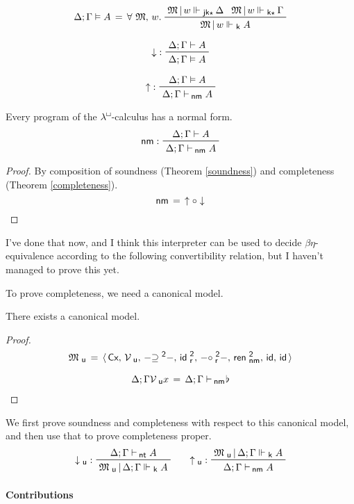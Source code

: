 \documentclass{entcs}
\numberwithin{equation}{thm}
\newcommand{\lambdabox}{\lambda^{\mkern-1mu\sq\mkern-2mu}}
\newcommand{\binop}[1]{-\mathord{#1}-}
\newcommand{\tsf}[1]{\textsf{\upshape{#1}}}
\newcommand{\stsf}[1]{\smash{\tsf{\small{#1}}}}
\renewcommand{\:}{\mathrel{:}}
\newcommand{\tyrule}[1]{\prftree[l]{${#1} \:\,$}}
\newcommand{\id}{\operatorname{\tsf{id}}}
\newcommand{\comp}{\mathrel{\circ}}
\let\oldforall\forall
\renewcommand{\forall}{\oldforall\,}
\newcommand{\0}{\varnothing}
\newcommand{\geqZ}{\mathrel{\supseteq^{\stsf{2}}}}
\newcommand{\ideZ}{\operatorname{\tsf{id}_{\stsf{r}}^{\stsf{2}}}}
\newcommand{\compeZ}{\mathrel{\circ_{\mkern-1mu\stsf{r}}^{\stsf{2}}}}
\newcommand{\base}{\flat}
\newcommand{\sq}{\Box}
\newcommand{\Cx}{\tsf{Cx}}
\renewcommand{\e}{\mathrel{\vdash}}
\newcommand{\enm}{\mathrel{\vdash_{\mkern-2mu\stsf{nm}}}}
\newcommand{\ent}{\mathrel{\vdash_{\mkern-2mu\stsf{nt}}}}
\newcommand{\rennmZ}{\operatorname{\tsf{ren}_{\stsf{nm}}^{\stsf{2}}}}
\newcommand{\M}{\mathfrak{M}}
\newcommand{\Mover}{\M\,|\,}
\newcommand{\eek}{\mathrel{\Vdash_{\stsf{k}}}}
\newcommand{\eeks}{\mathrel{\Vdash_{\stsf{k}\star\mkern-2mu}}}
\newcommand{\eejks}{\mathrel{\Vdash_{\stsf{jk}\star\mkern-2mu}}}
\newcommand{\eeq}{\mathrel{\vDash}}
\newcommand{\reflect}{\operatorname{\downarrow}}
\newcommand{\Mu}{\mathfrak{M}_{\stsf{u}}}
\newcommand{\Vu}{\mathcal{V}_{\stsf{u}}}
\newcommand{\reifyu}{\operatorname{\uparrow_{\stsf{u}}}}
\newcommand{\reflectu}{\operatorname{\downarrow_{\stsf{u}}}}
\newcommand{\reify}{\operatorname{\uparrow}}
\newcommand{\nm}{\operatorname{\tsf{nm}}}
\begin{document}
  \[\Delta; \Gamma \eeq A \,=\, \forall \M,\,w.\ \raisebox{-8pt}{$\prftree{\Mover w \eejks \Delta}{\Mover w \eeks \Gamma}{\Mover w \eek A}$}\]
\begin{theorem}[Soundness]
  \[\tyrule{\reflect}{\Delta; \Gamma \e A}{\Delta; \Gamma \eeq A}\]
\end{theorem}
\begin{theorem}[Completeness]
  \[\tyrule{\reify}{\Delta; \Gamma \eeq A}{\Delta; \Gamma \enm A}\]
\end{theorem}
\begin{corollary}[Normalisation]
  Every program of the $\lambdabox$-calculus has a normal form.
  \[\tyrule{\nm}{\Delta; \Gamma \e A}{\Delta; \Gamma \enm A}\]
  \begin{proof}\normalshape %
    By composition of soundness (Theorem \ref{soundness}) and completeness (Theorem \ref{completeness}).
    \[\nm \,=\, \reify \comp \reflect\]
  \end{proof}
\end{corollary}\noindent %
I've done that now, and I think this interpreter can be used to decide $\beta\eta$-equivalence according to the following convertibility relation, but I haven't managed to prove this yet.

To prove completeness, we need a canonical model.
\begin{theorem}
  There exists a canonical model.
  \begin{proof}\normalshape %
    \begin{gather*}
      \Mu \,=\, \langle\,\Cx,\,\Vu,\,\binop{\geqZ},\,\ideZ,\,\binop{\compeZ},\,\rennmZ,\,\id,\,\id\,\rangle\\[0.5\baselineskip]
      \Delta; \Gamma \Vu x \,=\, \Delta; \Gamma \enm \mkern-4mu \base
    \end{gather*}
  \end{proof}
\end{theorem}\noindent %
We first prove soundness and completeness with respect to this canonical model, and then use that to prove completeness proper.
\begin{gather*}
  \tyrule{\reflectu}{\Delta; \Gamma \ent A}{\Mu\,|\,\Delta; \Gamma \eek A}\qquad
  \tyrule{\reifyu}{\Mu\,|\,\Delta; \Gamma \eek A}{\Delta; \Gamma \enm A}
\end{gather*}

\paragraph{Contributions}
\lipsum[1-2]
\end{document}
